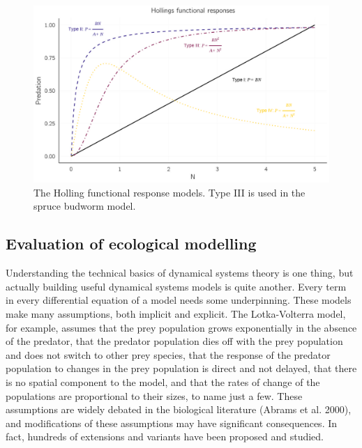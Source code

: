\documentclass[
  a4paper,
  DIV=11,
  numbers=noendperiod,
  oneside]{scrreprt}
\begin{document}
\begin{figure}

{\centering \includegraphics{media/ch4n/fig-ch4n-img5-old-53.jpg}

}

\caption{\label{fig-ch4n-img5-old-53}The Holling functional response
models. Type III is used in the spruce budworm model.}

\end{figure}

\hypertarget{sec-Evaluation-of-ecological-modelling}{%
\subsection{Evaluation of ecological
modelling}\label{sec-Evaluation-of-ecological-modelling}}

Understanding the technical basics of dynamical systems theory is one
thing, but actually building useful dynamical systems models is quite
another. Every term in every differential equation of a model needs some
underpinning. These models make many assumptions, both implicit and
explicit. The Lotka-Volterra model, for example, assumes that the prey
population grows exponentially in the absence of the predator, that the
predator population dies off with the prey population and does not
switch to other prey species, that the response of the predator
population to changes in the prey population is direct and not delayed,
that there is no spatial component to the model, and that the rates of
change of the populations are proportional to their sizes, to name just
a few. These assumptions are widely debated in the biological literature
(Abrams et al. 2000), and modifications of these assumptions may have
significant consequences. In fact, hundreds of extensions and variants
have been proposed and studied.
\end{document}
